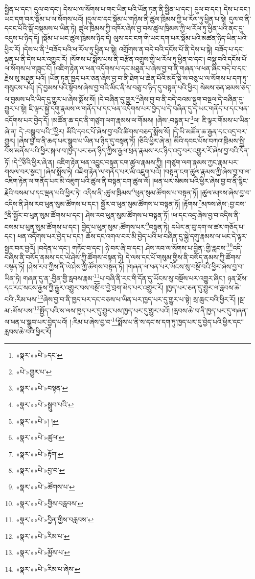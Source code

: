 སྦྱིན་པ་དང་། དུལ་བ་དང་། དེས་པ་ལ་སོགས་པ་གང་ཡིན་པའི་ཡོན་ཏན་ནི་སྦྱིན་པ་དང་། དུལ་བ་དང་། དེས་པ་དང་། ཡང་དག་བར་སྡོམ་པ་ལ་སོགས་པའོ། །དུལ་བ་དང་སྡོམ་པ་གཉིས་ནི་ཚུལ་ཁྲིམས་ཀྱི་ཕ་རོལ་ཏུ་ཕྱིན་པ་སྟེ། དུལ་བ་ནི་དབང་པོའི་སྒོ་བསྡམས་པ་ཡིན་ཏེ། ཚུལ་ཁྲིམས་ཀྱི་འཁོར་ཞེས་བྱ་བས་ཚུལ་ཁྲིམས་ཀྱི་ཕ་རོལ་ཏུ་ཕྱིན་པའི་ནང་དུ་འདུས་པ་ཉིད་དོ། །སྡོམ་པ་ཡང་ཚུལ་ཁྲིམས་ཉིད་དེ། ལུས་དང་ངག་གི་ཡང་དག་པར་སྡོམ་པའི་མཚན་ཉིད་ཡིན་པའི་ཕྱིར་རོ། །དེས་པ་ནི་\footnote{«སྣར་»«པེ་»དང་}བཟོད་པའི་ཕ་རོལ་ཏུ་ཕྱིན་པ་སྟེ། འགྲོགས་ན་བདེ་བའི་དངོས་པོ་ནི་དེས་པ་སྟེ། བཟོད་པ་དང་ལྡན་པ་ནི་དེས་པར་འགྱུར་རོ། །སོགས་པ་སྨོས་པས་ནི་བརྩོན་འགྲུས་གྱི་ཕ་རོལ་ཏུ་ཕྱིན་བ་དང་། བསྡུ་བའི་དངོས་པོ་ལ་སོགས་པ་གཟུང་ངོ། །འཇིག་རྟེན་ལ་ཕན་འདོགས་པ་དང་མཐུན་པ་ཞེས་བྱ་བ་ནི་གཞན་ལ་ཕན་ཞིང་བདེ་བ་དང་རྗེས་སུ་མཐུན་པའོ། །ཡོན་ཏན་ཁྱད་པར་ཅན་ཞེས་བྱ་བ་ནི་ཐེག་པ་ཆེན་པོའི་མདོ་སྡེ་ས་བཅུ་པ་ལ་སོགས་པ་དག་ཏུ་གསུངས་པའོ། །དེ་བྱམས་པའི་སྟོབས་ཞེས་བྱ་བའི་མིང་ནི་ས་བཅུ་བ་ཉིད་དུ་བསྟན་པའི་ཕྱིར། སེམས་ཅན་ཐམས་ཅད་ལ་བྱམས་པའི་ཡིད་དུ་གྱུར་པ་ཞེས་སྨོས་སོ། །དེ་བཞིན་དུ་གྱུར་\footnote{«པེ་»གྱུར་པ་}ཞེས་བྱ་བ་ནི་བདེ་བའམ་སྡུག་བསྔལ་དེ་བཞིན་དུ་གྱུར་པ་སྟེ། ཇི་ལྟར་སྐྱེ་དགུ་རྣམས་ལ་གནོད་པ་དང་ཕན་འདོགས་པར་བྱེད་པ་དེ་བཞིན་དུ་དེ་ཡང་གནོད་པ་དང་ཕན་འདོགས་པར་བྱེད་དོ། །མཚོན་ཆ་དང་ནི་གཙུག་ལག་རྣམས་ལ་གོམས། །ཞེས་:བསྟན་པ་\footnote{«སྣར་»«པེ་»བསྟན་}ལ། ཇི་ལྟར་གོམས་པ་ཡིན་ཞེ་ན། དེ་:བསྒྲུབ་པའི་\footnote{«སྣར་»«པེ་»སྒྲུབ་པའི་}ཕྱིར། མིའི་དབང་པོ་ཞེས་བྱ་བའི་ཚིགས་བཅད་སྨོས་སོ། །དེ་ཡི་མཚོན་ཆ་རྒྱན་དང་འདྲ་བར་གྱུར། །ཞེས་བྱ་བ་ནི་ཆད་པར་སྒྲུབ་པ་ཡིན་པ་ཉིད་དུ་བསྟན་ཏོ། །ཅིའི་ཕྱིར་ཞེ་ན། མིའི་དབང་པོས་བཀའ་ཁྲིམས་སྤྱི་བོས་མནོས་པའི་ཕྱིར་སྐལ་བ་ཁྱད་པར་ཅན་ཉིད་ཀྱིས་རྒྱལ་ཕྲན་རྣམས་རང་ཉིད་འདུ་བར་འགྱུར་རོ་ཞེས་བྱ་བའི་དོན་ཏོ། །དེ་\footnote{«སྣར་»«པེ་»། །}ཅིའི་ཕྱིར་ཞེ་ན། འཇིག་རྟེན་ཕན་འབྱུང་བསྟན་ངག་ཚུལ་རྣམས་ཀྱི། །གཙུག་ལག་རྣམས་ཀྱང་རྣམ་པར་གསལ་བར་སྣང་། །ཞེས་སྨོས་ཏེ། འཇིག་རྟེན་ལ་གནོད་པར་མི་འཇུག་པའོ། །བསྟན་ངག་ཚུལ་རྣམས་ཀྱི་ཞེས་བྱ་བ་ལ་འཇིག་རྟེན་ལ་གནོད་པར་མི་འཇུག་པའི་ཚུལ་ནི་བསྟན་ངག་ཚུལ་ལོ། །ཕན་པར་སེམས་པའི་ཕྱིར་ཞེས་བྱ་བ་ནི་སྙིང་རྗེའི་བསམ་པ་དང་ལྡན་པའི་ཕྱིར་ཏེ། འདིས་ནི་:ཚུལ་ཁྲིམས་\footnote{«སྣར་»«པེ་»ཚུལ་}ཕུན་སུམ་ཚོགས་པ་བསྟན་ཏོ། །ཚུལ་མཁས་ཞེས་བྱ་བ་འདིས་ནི་ཤེས་རབ་ཕུན་སུམ་ཚོགས་པ་དང་། སྦྱོར་བ་ཕུན་སུམ་ཚོགས་པ་བསྟན་ཏོ། །རྟོགས་\footnote{«སྣར་»«པེ་»རྟོག་}མཁས་ཞེས་:བྱ་བས་\footnote{«སྣར་»«པེ་»བྱ་བ་}ནི་སྦྱོར་བ་ཕུན་སུམ་ཚོགས་པ་དང་། ཤེས་རབ་ཕུན་སུམ་ཚོགས་པ་བསྟན་ཏོ། །ཕ་དང་འདྲ་ཞེས་བྱ་བ་འདིས་ནི་བསམ་པ་ཕུན་སུམ་ཚོགས་པ་དང་། བྱེད་པ་ཕུན་སུམ་:ཚོགས་པར་\footnote{«སྣར་»«པེ་»ཚོགས་པ་}བསྟན་ཏེ། དཔེར་ན་བུ་དག་ལ་ཚར་གཅོད་པ་དང་། ཕན་འདོགས་པར་བྱེད་པ་དང་། ཆོས་དང་འགལ་བར་མི་བྱེད་པའི་ཕ་བཞིན་དུ་སྐྱེ་དགུ་རྣམས་ལ་ཡང་དེ་ལྟར་སྦྱར་བར་བྱའོ། །བདེན་པ་དང་། གཏོང་བ་དང་། ཉེ་བར་ཞི་བ་དང་། ཤེས་རབ་ལ་སོགས་པ་བྱིན་:གྱི་རླབས་\footnote{«སྣར་»«པེ་»གྱིས་བརླབས་}འདི་བཞིས་ནི་བསོད་ནམས་དང་ཡེ་ཤེས་ཀྱི་ཚོགས་བསྟན་ཏེ། དེ་ལས་དང་པོ་གསུམ་གྱིས་ནི་བསོད་ནམས་ཀྱི་ཚོགས་བསྟན་ཏོ། །ཤེས་རབ་ཀྱིས་ནི་ཡེ་ཤེས་ཀྱི་ཚོགས་བསྟན་ཏོ། །གཞན་ལ་ཕན་པར་ཡོངས་སུ་བསྔོ་བའི་ཕྱིར་ཞེས་བྱ་བ་ཡིན་ཏེ། གཞན་དུ་ན་:བྱིན་གྱི་རླབས་རྣམ་\footnote{«སྣར་»«པེ་»བྱིན་གྱིས་བརླབས་}པ་བཞི་ནི་རང་གི་དོན་དུ་ཡོངས་སུ་བསྔོས་པར་འགྱུར་ཞིང་། ཉན་ཐོས་དང་རང་སངས་རྒྱས་ཀྱི་རྒྱུར་འགྱུར་བས་བསྔོ་བ་བྱེ་བྲག་མེད་པར་འགྱུར་རོ། །ཁྱད་པར་ཅན་དུ་གྱུར་ལ་རླབས་ཆེ་བའི་:རིམ་པས་\footnote{«སྣར་»«པེ་»རིམ་པ་}ཞེས་བྱ་བ་ནི་ཁྱད་པར་དང་བཅས་པ་ཡིན་པར་ཁྱད་པར་དུ་གྱུར་པ་སྟེ། སྲ་ཆུང་བའི་ཕྱིར་རོ། །སྔ་མ་:མོས་པས་\footnote{«སྣར་»«པེ་»མྱོས་པ་}སྤྱོད་པའི་ས་ལས་ཁྱད་པར་དུ་གྱུར་པས་ཁྱད་པར་དུ་གྱུར་པའོ། །རླབས་ཆེ་བ་ནི་ཁྱད་པར་དུ་གཞན་ལ་ཕན་པ་སྒྲུབ་པར་བྱེད་པའོ། །:རིམ་པ་ཞེས་བྱ་བ་\footnote{«སྣར་»«པེ་»རིམ་པ་ཞེས་}སྨོས་པ་ནི་ས་དང་ས་དག་ཏུ་ཁྱད་པར་དུ་བྱེད་པའི་ཕྱིར་དང་། རླབས་ཆེ་བའི་ཕྱིར་རོ། 